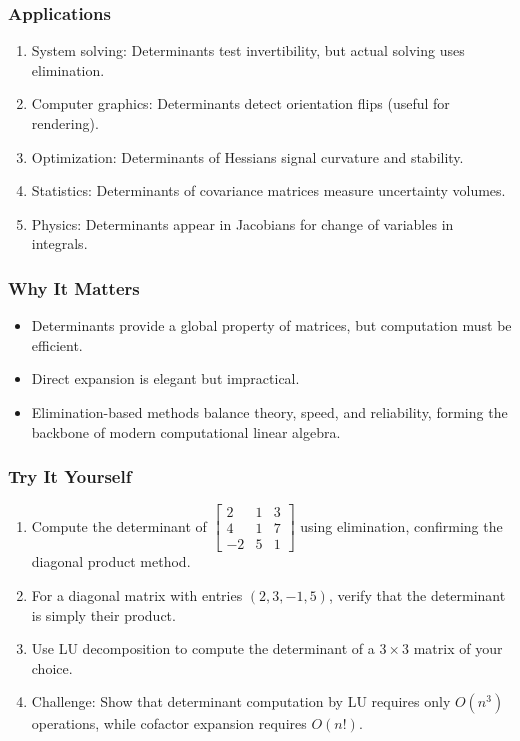 \documentclass[
  letterpaper,
  DIV=11,
  numbers=noendperiod]{scrreprt}
\providecommand{\tightlist}{%
  \setlength{\itemsep}{0pt}\setlength{\parskip}{0pt}}
\begin{document}
\subsubsection{Applications}\label{applications-22}

\begin{enumerate}
\def\labelenumi{\arabic{enumi}.}
\tightlist
\item
  System solving: Determinants test invertibility, but actual solving
  uses elimination.
\item
  Computer graphics: Determinants detect orientation flips (useful for
  rendering).
\item
  Optimization: Determinants of Hessians signal curvature and stability.
\item
  Statistics: Determinants of covariance matrices measure uncertainty
  volumes.
\item
  Physics: Determinants appear in Jacobians for change of variables in
  integrals.
\end{enumerate}

\subsubsection{Why It Matters}\label{why-it-matters-56}

\begin{itemize}
\tightlist
\item
  Determinants provide a global property of matrices, but computation
  must be efficient.
\item
  Direct expansion is elegant but impractical.
\item
  Elimination-based methods balance theory, speed, and reliability,
  forming the backbone of modern computational linear algebra.
\end{itemize}

\subsubsection{Try It Yourself}\label{try-it-yourself-59}

\begin{enumerate}
\def\labelenumi{\arabic{enumi}.}
\tightlist
\item
  Compute the determinant of
  \(\begin{bmatrix} 2 & 1 & 3 \\ 4 & 1 & 7 \\ -2 & 5 & 1 \end{bmatrix}\)
  using elimination, confirming the diagonal product method.
\item
  For a diagonal matrix with entries \((2, 3, -1, 5)\), verify that the
  determinant is simply their product.
\item
  Use LU decomposition to compute the determinant of a \(3 \times 3\)
  matrix of your choice.
\item
  Challenge: Show that determinant computation by LU requires only
  \(O(n^3)\) operations, while cofactor expansion requires \(O(n!)\).
\end{enumerate}
\end{document}
